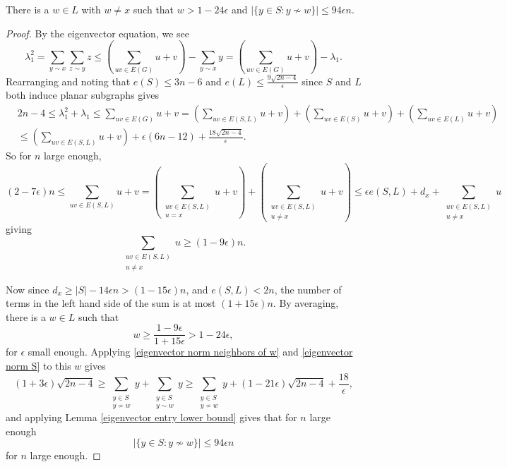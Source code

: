 \begin{lemma}\label{second vertex of large degree}
There is a $w\in L$ with $w\not=x$ such that $w> 1-24\epsilon$ and $|\{y\in S: y\not\sim w\}| \leq 94\epsilon n$.
\end{lemma}
\begin{proof}
By the eigenvector equation, we see
\[
\lambda_1^2 = \sum_{y\sim x}\sum_{z\sim y} z \leq \left(\sum_{uv\in E(G)} u+v\right) - \sum_{y\sim x} y = \left(\sum_{uv\in E(G)} u+v\right) - \lambda_1.
\]
Rearranging and noting that $e(S) \leq 3n-6$ and $e(L) \leq \frac{9\sqrt{2n-4}}{\epsilon}$ since $S$ and $L$ both induce planar subgraphs gives
\begin{align*}
& 2n-4\leq \lambda_1^2 + \lambda_1\leq \sum_{uv\in E(G)} u+v = \left(\sum_{uv\in E(S,L)} u+v\right) + \left(\sum_{uv\in E(S)} u+v\right) + \left(\sum_{uv\in E(L)} u+v \right) \\
& \leq \left(\sum_{uv\in E(S,L)} u+v \right) + \epsilon(6n-12) + \frac{18\sqrt{2n-4}}{\epsilon}.
\end{align*}
So for $n$ large enough,
\[
(2-7\epsilon)n \leq \sum_{uv\in E(S,L)} u+v =\left( \sum_{\substack{uv\in E(S,L)\\ u=x}} u+v\right) + \left(\sum_{\substack{uv\in E(S,L)\\ u\not= x}} u+v\right) \leq \epsilon e(S,L) + d_x + \sum_{\substack{uv\in E(S,L)\\ u\not= x} } u
\]
giving
\[
\sum_{\substack{uv\in E(S,L)\\ u\not = x}} u \geq (1-9\epsilon)n.
\]

Now since $d_x \geq |S| - 14\epsilon n > (1-15\epsilon)n$, and $e(S,L) < 2n$, the number of terms in the left hand side of the sum is at most $(1+15\epsilon)n$. By averaging, there is a $w\in L$ such that 
\[
w \geq \frac{1-9\epsilon}{1+15\epsilon} > 1-24\epsilon,
\]
for $\epsilon$ small enough. Applying \eqref{eigenvector norm neighbors of w} and \eqref{eigenvector norm S} to this $w$ gives
\[
(1+3\epsilon) \sqrt{2n-4} \geq \sum_{\substack{y\in S\\ y\not\sim w}} y + \sum_{\substack{y\in S\\ y\sim w}} y \geq \sum_{\substack{y\in S\\ y\not\sim w}} y + (1-21\epsilon)\sqrt{2n-4} + \frac{18}{\epsilon},
\]
and applying Lemma \ref{eigenvector entry lower bound} gives that for $n$ large enough
\[
|\{y\in S: y\not\sim w\}| \leq 94\epsilon n
\]
for $n$ large enough.

\end{proof}
\medskip

